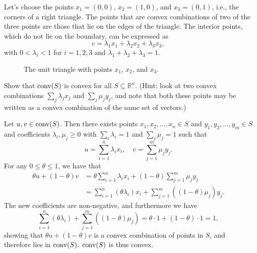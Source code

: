 \begin{solution}
  Let's choose the points $x_1 = (0, 0)$, $x_2 = (1, 0)$, and $x_3 = (0, 1)$, i.e., the corners of a right triangle.
  The points that are convex combinations of two of the three points are those that lie on the edges of the triangle.
  The interior points, which do not lie on the boundary, can be expressed as
  \begin{equation}
    c = \lambda_1 x_1 + \lambda_2 x_2 + \lambda_3 x_3,
  \end{equation}
  with $0 < \lambda_i < 1$ for $i = 1, 2, 3$ and $\lambda_1 + \lambda_2 + \lambda_3 = 1$.
  \begin{figure}[htbp]
    \centering

    \resizebox{0.3\textwidth}{!}{
      
    }
    \caption{
      The unit triangle with points $x_1$, $x_2$, and $x_3$.\label{fig:unit_triangle}
    }
  \end{figure}
\end{solution}

\begin{exercise}
  Show that $\operatorname*{conv}(S)$ is convex for all $S \subseteq \mathbb{R}^n$.
  (Hint: look at two convex combinations $\sum_j \lambda_j x_j$ and $\sum_j \mu_j y_j$, and note that both these points may be written as a convex combination of the same set of vectors.)
\end{exercise}

\begin{solution}
  Let $u, v \in \operatorname*{conv}(S)$.
  Then there exists points $x_1, x_2, \ldots, x_n \in S$ and $y_1, y_2, \ldots, y_m \in S$ and coefficients $\lambda_i, \mu_j \geq 0$ with $\sum_i \lambda_i = 1$ and $\sum_j \mu_j = 1$ such that
  \begin{equation}
    u = \sum_{i=1}^n \lambda_i x_i, \quad v = \sum_{j=1}^m \mu_j y_j.
  \end{equation}
  For any $0 \leq \theta \leq 1$, we have that
  \begin{equation}
    \begin{split}
      \theta u + (1 - \theta) v
      &= \theta \sum_{i=1}^n \lambda_i x_i + (1 - \theta) \sum_{j=1}^m \mu_j y_j \\
      &= \sum_{i=1}^n (\theta \lambda_i) x_i + \sum_{j=1}^m ((1 - \theta) \mu_j) y_j.
    \end{split}
  \end{equation}
  The new coefficients are non-negative, and furthermore we have
  \begin{equation}
    \sum_{i=1}^n (\theta \lambda_i) + \sum_{j=1}^m ((1 - \theta) \mu_j)
    = \theta \cdot 1 + (1 - \theta) \cdot 1
    = 1,
  \end{equation}
  showing that $\theta u + (1 - \theta) v$ is a convex combination of points in $S$, and therefore lies in $\operatorname*{conv}(S)$.
  $\operatorname*{conv}(S)$ is thus convex.
\end{solution}

